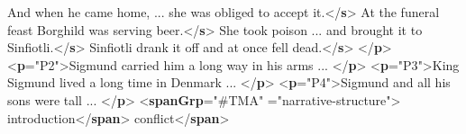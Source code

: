 \begin{shaded}
And when he came home, ... she was obliged to accept it.{</\textbf{s}>}\mbox{}\newline 
{}At the funeral feast Borghild was serving beer.{</\textbf{s}>}\mbox{}\newline 
{}She took poison ... and brought it to Sinfiotli.{</\textbf{s}>}\mbox{}\newline 
{}Sinfiotli drank it off and at once fell dead.{</\textbf{s}>}\mbox{}\newline 
{}\mbox{}\newline 
{</\textbf{p}>}\mbox{}\newline 
{<\textbf{p}\hspace*{1em}{xml:id}="{P2}">}Sigmund carried him a long way in his arms ... {</\textbf{p}>}\mbox{}\newline 
{<\textbf{p}\hspace*{1em}{xml:id}="{P3}">}King Sigmund lived a long time in Denmark ... {</\textbf{p}>}\mbox{}\newline 
{<\textbf{p}\hspace*{1em}{xml:id}="{P4}">}Sigmund and all his sons were tall ... {</\textbf{p}>}\mbox{}\newline 
{<\textbf{spanGrp}\hspace*{1em}{resp}="{\#TMA}"\mbox{}\newline 
\hspace*{1em}{type}="{narrative-structure}">}\mbox{}\newline 
{}introduction{</\textbf{span}>}\mbox{}\newline 
{}conflict{</\textbf{span}>}\mbox{}\newline 

\end{shaded}
